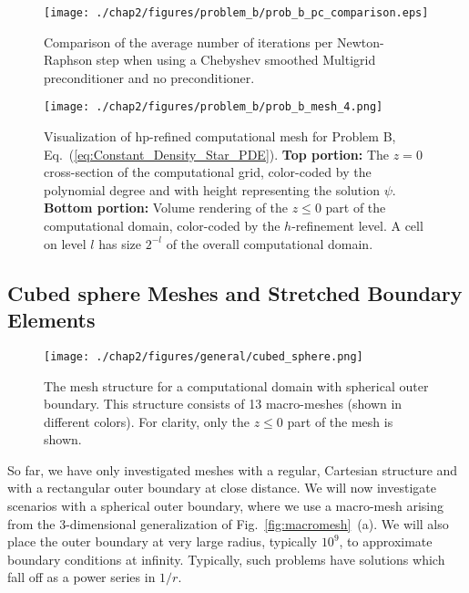 \begin{figure}[ht!]
  \centering
 \texttt{[image: ./chap2/figures/problem\_b/prob\_b\_pc\_comparison.eps]}
  \caption{Comparison of the average number of iterations per Newton-Raphson step when using a Chebyshev smoothed Multigrid preconditioner and no preconditioner.}
  \label{fig:problem_b_pc_comparison} 
\end{figure}


\begin{figure}[ht!]
  \centering
  \texttt{[image: ./chap2/figures/problem\_b/prob\_b\_mesh\_4.png]}
  \caption{ \label{fig:problem_b_mesh} Visualization of
      hp-refined computational mesh for Problem B,
      Eq.~(\ref{eq:Constant_Density_Star_PDE}).  {\bf Top portion:}
      The $z=0$ cross-section of the computational grid, color-coded
      by the polynomial degree and with height representing the
      solution $\psi$.  {\bf Bottom portion:} Volume rendering of the
      $z\le 0$ part of the computational domain, color-coded by the
      $h$-refinement level.  A cell on level $l$ has size $2^{-l}$ of
      the overall computational domain. }
\end{figure}

\subsection{Cubed sphere Meshes and Stretched Boundary Elements}
  \label{sec:CompactifiedLorentizan}

\begin{figure}[ht!]
  \centering
  \texttt{[image: ./chap2/figures/general/cubed\_sphere.png]}
  \caption{
The mesh structure for a computational domain with spherical outer boundary.  This structure consists of 13 macro-meshes (shown in different colors).  For clarity, only the $z\le 0$ part of the mesh is shown. }
  \label{fig:cubed_sphere_mesh}
\end{figure}

So far, we have only investigated meshes with a regular,
  Cartesian structure and with a rectangular outer boundary at close
  distance.  We will now investigate scenarios with a spherical outer
  boundary, where we use a macro-mesh arising from the 3-dimensional
  generalization of Fig.~\ref{fig:macromesh}~(a).  We will also place
  the outer boundary at very large radius, typically $10^9$, to
  approximate boundary conditions at infinity. Typically, such problems have solutions which fall off as a
power series in $1/r$.

